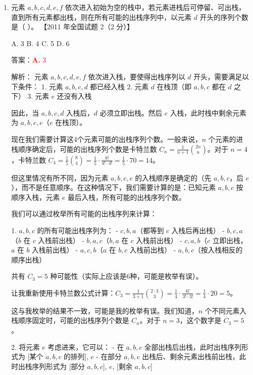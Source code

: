 \documentclass[lang=cn,newtx,10pt,scheme=chinese]{../../../elegantbook}
\begin{document}
\begin{enumerate}
    \item 元素 $a, b, c, d, e,f$ 依次进入初始为空的栈中，若元素进栈后可停留、可出栈，直到所有元素都出栈，则在所有可能的出栈序列中，以元素 $d$ 开头的序列个数是（ ）。  
    【2011 年全国试题 2（2 分）】  

    A. 3 \quad B. 4 \quad C. 5 \quad D. 6  

    答案：\textcolor{red}{\textbf{A.} 3}

    解析：
    元素 $a, b, c, d, e, f$ 依次进入栈，要使得出栈序列以 $d$ 开头，需要满足以下条件：
    1. 元素 $a, b, c, d$ 都已经入栈
    2. 元素 $d$ 在栈顶（即 $a, b, c$ 都在 $d$ 之下）
    3. 元素 $e$ 还没有入栈
    
    因此，当 $a, b, c, d$ 入栈后，$d$ 必须立即出栈。然后 $e$ 入栈，此时栈中剩余元素为 $a, b, c, e$（$e$ 在栈顶）。

    现在我们需要计算这4个元素可能的出栈序列个数。一般来说，$n$ 个元素的进栈顺序确定后，可能的出栈序列个数是卡特兰数 $C_n = \frac{1}{n+1}\binom{2n}{n}$。对于 $n=4$，卡特兰数 $C_4 = \frac{1}{5}\binom{8}{4} = \frac{1}{5} \cdot \frac{8!}{4! \cdot 4!} = \frac{1}{5} \cdot 70 = 14$。

    但这里情况有所不同，因为元素 $a, b, c, e$ 的入栈顺序是确定的（先 $a, b, c$，后 $e$），而不是任意顺序。在这种情况下，我们需要计算的是：已知元素 $a, b, c$ 按顺序入栈，元素 $e$ 最后入栈，所有可能的出栈序列个数。

    我们可以通过枚举所有可能的出栈序列来计算：

    1. $a, b, c$ 的所有可能出栈序列为：
       - $c, b, a$（都等到 $c$ 入栈后再出栈）
       - $b, c, a$（$b$ 在 $c$ 入栈前出栈）
       - $b, a, c$（$b, a$ 在 $c$ 入栈前出栈）
       - $c, a, b$（$c$ 立即出栈，$a$ 在 $b$ 入栈前出栈）
       - $a, c, b$（$a$ 在 $b, c$ 入栈前出栈）
       - $a, b, c$（按入栈相反的顺序出栈）
       
       共有 $C_3 = 5$ 种可能性（实际上应该是6种，可能是枚举有误）。
       
       让我重新使用卡特兰数公式计算：$C_3 = \frac{1}{3+1}\binom{2\cdot3}{3} = \frac{1}{4} \cdot \frac{6!}{3! \cdot 3!} = \frac{1}{4} \cdot 20 = 5$。
       
       这与我枚举的结果不一致，可能是我的枚举有误。我们知道，$n$ 个不同元素入栈顺序固定时，可能的出栈序列个数是 $C_n$。对于 $n=3$，这个数字是 $C_3 = 5$。

    2. 将元素 $e$ 考虑进来，它可以：
       - 在 $a, b, c$ 全部出栈后出栈，此时出栈序列形式为 [某个 $a,b,c$ 的排列], $e$
       - 在部分 $a, b, c$ 出栈后、剩余元素出栈前出栈，此时出栈序列形式为 [部分 $a,b,c$], $e$, [剩余 $a,b,c$]
       

\end{enumerate}
\end{document}
